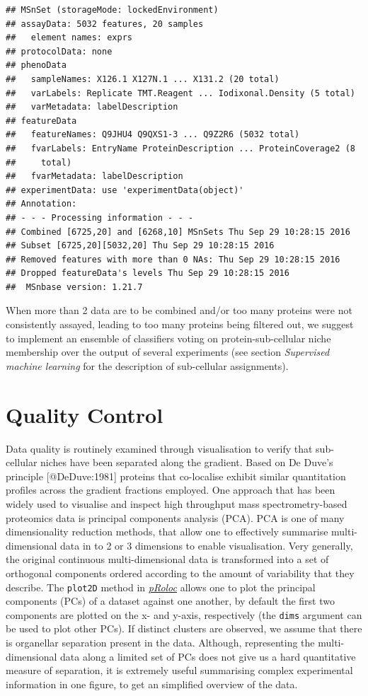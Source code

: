 \begin{verbatim}
## MSnSet (storageMode: lockedEnvironment)
## assayData: 5032 features, 20 samples 
##   element names: exprs 
## protocolData: none
## phenoData
##   sampleNames: X126.1 X127N.1 ... X131.2 (20 total)
##   varLabels: Replicate TMT.Reagent ... Iodixonal.Density (5 total)
##   varMetadata: labelDescription
## featureData
##   featureNames: Q9JHU4 Q9QXS1-3 ... Q9Z2R6 (5032 total)
##   fvarLabels: EntryName ProteinDescription ... ProteinCoverage2 (8
##     total)
##   fvarMetadata: labelDescription
## experimentData: use 'experimentData(object)'
## Annotation:  
## - - - Processing information - - -
## Combined [6725,20] and [6268,10] MSnSets Thu Sep 29 10:28:15 2016 
## Subset [6725,20][5032,20] Thu Sep 29 10:28:15 2016 
## Removed features with more than 0 NAs: Thu Sep 29 10:28:15 2016 
## Dropped featureData's levels Thu Sep 29 10:28:15 2016 
##  MSnbase version: 1.21.7
\end{verbatim}

When more than 2 data are to be combined and/or too many proteins were
not consistently assayed, leading to too many proteins being filtered
out, we suggest to implement an ensemble of classifiers voting on
protein-sub-cellular niche membership over the output of several
experiments (see section \emph{Supervised machine learning} for the
description of sub-cellular assignments).

\section{Quality Control}\label{quality-control}

Data quality is routinely examined through visualisation to verify that
sub-cellular niches have been separated along the gradient. Based on De
Duve's principle {[}@DeDuve:1981{]} proteins that co-localise exhibit
similar quantitation profiles across the gradient fractions employed.
One approach that has been widely used to visualise and inspect high
throughput mass spectrometry-based proteomics data is principal
components analysis (PCA). PCA is one of many dimensionality reduction
methods, that allow one to effectively summarise multi-dimensional data
in to 2 or 3 dimensions to enable visualisation. Very generally, the
original continuous multi-dimensional data is transformed into a set of
orthogonal components ordered according to the amount of variability
that they describe. The \texttt{plot2D} method in
\emph{\href{http://bioconductor.org/packages/pRoloc}{pRoloc}} allows one
to plot the principal components (PCs) of a dataset against one another,
by default the first two components are plotted on the x- and y-axis,
respectively (the \texttt{dims} argument can be used to plot other PCs).
If distinct clusters are observed, we assume that there is organellar
separation present in the data. Although, representing the
multi-dimensional data along a limited set of PCs does not give us a
hard quantitative measure of separation, it is extremely useful
summarising complex experimental information in one figure, to get an
simplified overview of the data.

